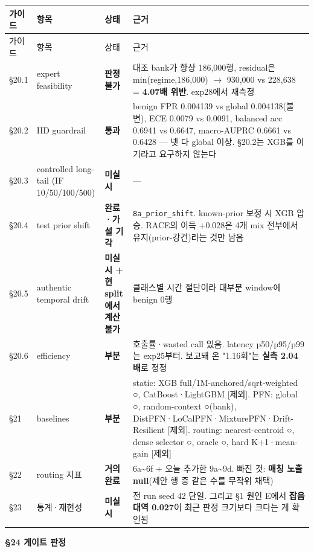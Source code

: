 \begingroup
\footnotesize
\begin{longtable}{>{\raggedright\arraybackslash}p{}>{\raggedright\arraybackslash}p{}>{\raggedright\arraybackslash}p{}>{\raggedright\arraybackslash}p{}}
\toprule
가이드 & 항목 & 상태 & 근거 \\ \midrule
\endfirsthead
가이드 & 항목 & 상태 & 근거 \\ \midrule
\endhead
{}§20.1 & expert feasibility & \textbf{판정 불가} & 대조 bank가 항상 186,000행, residual은 min(regime,186,000)  \ensuremath{\rightarrow}  930,000 vs 228,638 =\allowbreak{} \textbf{4.07배 위반}. exp28에서 재측정 \\
{}§20.2 & IID guardrail & \textbf{통과} & benign FPR 0.004139 vs global 0.004138(불변), ECE 0.0079 vs 0.0091, balanced acc 0.6941 vs 0.6647, macro-AUPRC 0.6661 vs 0.6428 — 넷 다 global 이상. §20.2는 XGB를 이기라고 요구하지 않는다 \\
{}§20.3 & controlled long-tail (IF 10/\allowbreak{}50/\allowbreak{}100/\allowbreak{}500) & \textbf{미실시} & — \\
{}§20.4 & test prior shift & \textbf{완료·가설 기각} & 0828 \texttt{8a\_\allowbreak{}\allowbreak{}prior\allowbreak{}\_\allowbreak{}\allowbreak{}shift}. known-prior 보정 시 XGB 압승. RACE의 이득 +\allowbreak{}0.028은 4개 mix 전부에서 유지(prior-강건)라는 것만 남음 \\
{}§20.5 & authentic temporal drift & \textbf{미실시 +\allowbreak{} 현 split에서 계산 불가} & 클래스별 시간 절단이라 대부분 window에 benign 0행 \\
{}§20.6 & efficiency & \textbf{부분} & 호출률·wasted call 있음. latency p50/\allowbreak{}p95/\allowbreak{}p99는 exp25부터. 보고돼 온 "1.16회"는 \textbf{실측 2.04배}로 정정 \\
{}§21 & baselines & \textbf{부분} & static: XGB full/\allowbreak{}1M-anchored/\allowbreak{}sqrt-weighted ○, CatBoost·LightGBM [제외]. PFN: global ○, random-context ○(bank), DistPFN·LoCalPFN·MixturePFN·Drift-Resilient [제외]. routing: nearest-centroid ○, dense selector ○, oracle ○, hard K+\allowbreak{}1·mean-gain [제외] \\
{}§22 & routing 지표 & \textbf{거의 완료} & 6a\textasciitilde{}6f +\allowbreak{} 오늘 추가한 9a\textasciitilde{}9d. 빠진 것: \textbf{매칭 노출 null}(제안 행 중 같은 수를 무작위 채택) \\
{}§23 & 통계·재현성 & \textbf{미실시} & 전 run seed 42 단일. 그리고 §1 원인 E에서 \textbf{잡음 대역 0.027}이 최근 판정 크기보다 크다는 게 확인됨 \\
\bottomrule
\end{longtable}
\endgroup
\textbf{§24 게이트 판정}

